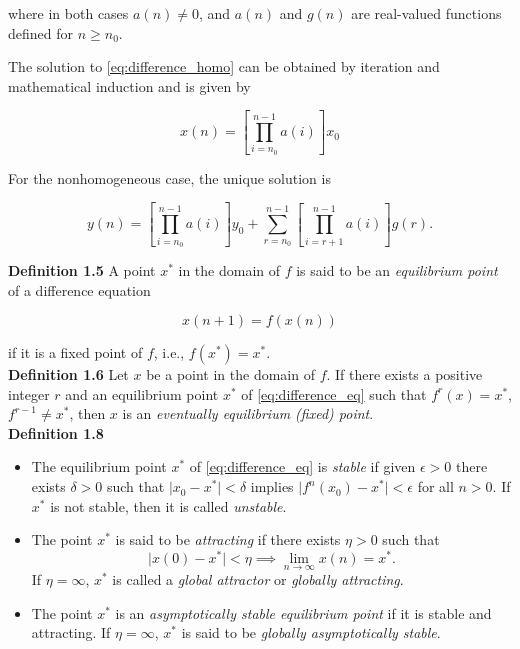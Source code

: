 \documentclass[12pt]{article}
\begin{document}
\noindent where in both cases \(a(n) \neq 0\), and \(a(n)\) and \(g(n)\) are real-valued functions defined for \(n \geq n_0\).

The solution to \eqref{eq:difference_homo} can be obtained by iteration and mathematical induction and is given by

\begin{equation}
    x(n) = \left[\prod_{i=n_0}^{n-1}a(i)\right] x_0
\end{equation}

For the nonhomogeneous case, the unique solution is

\begin{equation}
    y(n) = \left[\prod_{i=n_0}^{n-1}a(i)\right]y_0 +  \sum_{r=n_0}^{n-1}\left[\prod_{i=r+1}^{n-1}a(i)\right]g(r).
\end{equation}

\noindent\textbf{Definition 1.5} A point \(x^*\) in the domain of \(f\) is said to be an \emph{equilibrium point} of a difference equation 

\begin{equation}
    x(n+1) = f(x(n))\label{eq:difference_eq}
\end{equation} 

\noindent if it is a fixed point of \(f\), i.e., \(f(x^*) = x^*\).\\

\noindent\textbf{Definition 1.6} Let \(x\) be a point in the domain of \(f\). If there exists a positive integer \(r\) and an equilibrium point \(x^*\) of \eqref{eq:difference_eq} such that \(f^r(x) = x^*\), \(f^{r-1} \neq x^*\), then \(x\) is an \emph{eventually equilibrium (fixed) point}.\\

\noindent\textbf{Definition 1.8} 

\begin{itemize}
    \item [(a)] The equilibrium point \(x^*\) of \eqref{eq:difference_eq} is \emph{stable} if given \(\epsilon > 0\) there exists \(\delta > 0\) such that \(\vert x_0 - x^* \vert < \delta\) implies \(\vert f^n(x_0) - x^* \vert < \epsilon\) for all \(n > 0\). If \(x^*\) is not stable, then it is called \emph{unstable}.
    \item [(b)] The point \(x^*\) is said to be \emph{attracting} if there exists \(\eta > 0\) such that \[\vert x(0) - x^* \vert < \eta \implies \lim_{n\to\infty} x(n) = x^*.\] If \(\eta = \infty\), \(x^*\) is called a \emph{global attractor} or \emph{globally attracting}.
    \item [(c)] The point \(x^*\) is an \emph{asymptotically stable equilibrium point} if it is stable and attracting. If \(\eta = \infty\), \(x^*\) is said to be \emph{globally asymptotically stable}.
\end{itemize}
\end{document}
